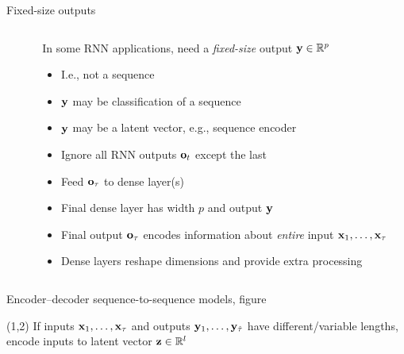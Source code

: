 \begin{frame}{Fixed-size outputs}
    \begin{columns}
        \begin{column}{0.37\textwidth}
        \end{column}
        \begin{column}{0.63\textwidth}
            In some RNN{} applications, need a \emph{fixed-size} output $\mathbf{y} \in \mathbb{R}^p$
            \begin{itemize}
                \item<+-> I.e., not a sequence
                \item $\mathbf{y}$ may be classification of a sequence
                \item $\mathbf{y}$ may be a latent vector, e.g., sequence encoder
            \end{itemize}
            \begin{itemize}[<.->]
                \item Ignore all RNN{} outputs $\mathbf{o}_t$ except the last
                \item Feed $\mathbf{o}_\tau$ to dense layer(s)
                \item Final dense layer has width $p$ and output $\mathbf{y}$
            \end{itemize}
            \begin{itemize}[<.->]
                \item Final output $\mathbf{o}_\tau$ encodes information about \emph{entire} input $\mathbf{x}_1, \ldots, \mathbf{x}_\tau$
                \item Dense layers reshape dimensions and provide extra processing
            \end{itemize}
        \end{column}
    \end{columns}
\end{frame}

\begin{frame}{Encoder--decoder sequence-to-sequence models, figure}
    \vspace{5mm}
    
    \vspace{-2.5mm}

    \begin{textblock}{9.5}(1,2)
        If inputs $\mathbf{x}_1, \dots, \mathbf{x}_\tau$ and outputs $\mathbf{y}_1, \dots, \mathbf{y}_{\hat{\tau}}$ have different/variable lengths, \alert{encode} inputs to latent vector $\mathbf{z} \in \mathbb{R}^l$
    \end{textblock}
\end{frame}

